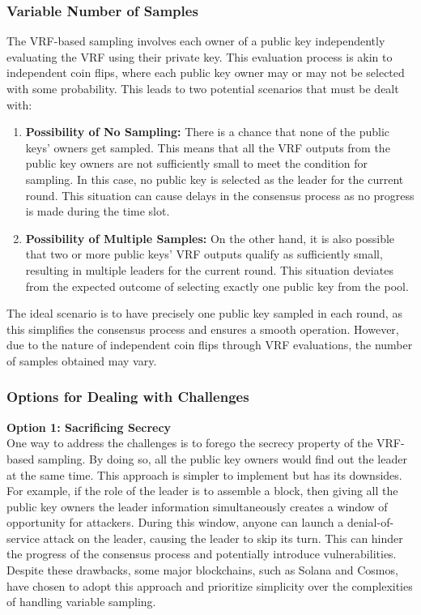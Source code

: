 \subsubsection{Variable Number of Samples}
The VRF-based sampling involves each owner of a public key independently evaluating the VRF using their private key. This evaluation process is akin to independent coin flips, where each public key owner may or may not be selected with some probability. This leads to two potential scenarios that must be dealt with:
\begin{enumerate}
    \item \textbf{Possibility of No Sampling:} There is a chance that none of the public keys' owners get sampled. This means that all the VRF outputs from the public key owners are not sufficiently small to meet the condition for sampling. In this case, no public key is selected as the leader for the current round. This situation can cause delays in the consensus process as no progress is made during the time slot.
    \item \textbf{Possibility of Multiple Samples:} On the other hand, it is also possible that two or more public keys' VRF outputs qualify as sufficiently small, resulting in multiple leaders for the current round. This situation deviates from the expected outcome of selecting exactly one public key from the pool.
\end{enumerate}
The ideal scenario is to have precisely one public key sampled in each round, as this simplifies the consensus process and ensures a smooth operation. However, due to the nature of independent coin flips through VRF evaluations, the number of samples obtained may vary.

\subsubsection{Options for Dealing with Challenges}
\noindent
\textbf{Option 1: Sacrificing Secrecy}\\
One way to address the challenges is to forego the secrecy property of the VRF-based sampling. By doing so, all the public key owners would find out the leader at the same time. This approach is simpler to implement but has its downsides.\\
For example, if the role of the leader is to assemble a block, then giving all the public key owners the leader information simultaneously creates a window of opportunity for attackers. During this window, anyone can launch a denial-of-service attack on the leader, causing the leader to skip its turn. This can hinder the progress of the consensus process and potentially introduce vulnerabilities.\\
Despite these drawbacks, some major blockchains, such as Solana and Cosmos, have chosen to adopt this approach and prioritize simplicity over the complexities of handling variable sampling.\\

